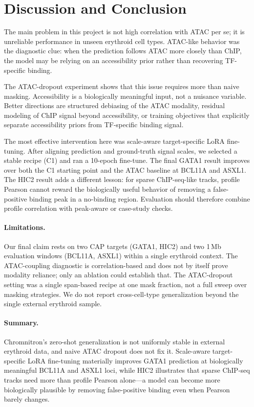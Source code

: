 \documentclass[nohyperref]{article}
\begin{document}
\balance
\section{Discussion and Conclusion}

The main problem in this project is not high correlation with ATAC per se; it is unreliable performance in unseen erythroid cell types. ATAC-like behavior was the diagnostic clue: when the prediction follows ATAC more closely than ChIP, the model may be relying on an accessibility prior rather than recovering TF-specific binding.

The ATAC-dropout experiment shows that this issue requires more than naive masking. Accessibility is a biologically meaningful input, not a nuisance variable. Better directions are structured debiasing of the ATAC modality, residual modeling of ChIP signal beyond accessibility, or training objectives that explicitly separate accessibility priors from TF-specific binding signal.

The most effective intervention here was scale-aware target-specific LoRA fine-tuning. After aligning prediction and ground-truth signal scales, we selected a stable recipe (C1) and ran a 10-epoch fine-tune. The final GATA1 result improves over both the C1 starting point and the ATAC baseline at BCL11A and ASXL1. The HIC2 result adds a different lesson: for sparse ChIP-seq-like tracks, profile Pearson cannot reward the biologically useful behavior of removing a false-positive binding peak in a no-binding region. Evaluation should therefore combine profile correlation with peak-aware or case-study checks.

\paragraph{Limitations.} Our final claim rests on two CAP targets (GATA1, HIC2) and two 1\,Mb evaluation windows (BCL11A, ASXL1) within a single erythroid context. The ATAC-coupling diagnostic is correlation-based and does not by itself prove modality reliance; only an ablation could establish that. The ATAC-dropout setting was a single span-based recipe at one mask fraction, not a full sweep over masking strategies. We do not report cross-cell-type generalization beyond the single external erythroid sample.

\paragraph{Summary.} Chromnitron's zero-shot generalization is not uniformly stable in external erythroid data, and naive ATAC dropout does not fix it. Scale-aware target-specific LoRA fine-tuning materially improves GATA1 prediction at biologically meaningful BCL11A and ASXL1 loci, while HIC2 illustrates that sparse ChIP-seq tracks need more than profile Pearson alone---a model can become more biologically plausible by removing false-positive binding even when Pearson barely changes.
\end{document}
